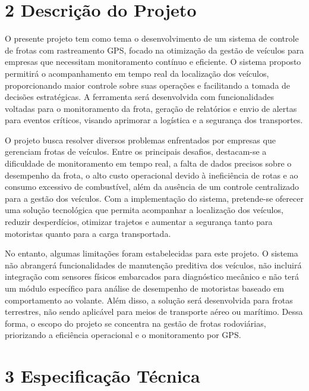\documentclass[12pt]{article}
\begin{document}
\newpage

\section*{2 Descrição do Projeto}

O presente projeto tem como tema o desenvolvimento de um sistema de controle de frotas com rastreamento GPS, focado na otimização da gestão de veículos para empresas que necessitam monitoramento contínuo e eficiente. O sistema proposto permitirá o acompanhamento em tempo real da localização dos veículos, proporcionando maior controle sobre suas operações e facilitando a tomada de decisões estratégicas. A ferramenta será desenvolvida com funcionalidades voltadas para o monitoramento da frota, geração de relatórios e envio de alertas para eventos críticos, visando aprimorar a logística e a segurança dos transportes.

O projeto busca resolver diversos problemas enfrentados por empresas que gerenciam frotas de veículos. Entre os principais desafios, destacam-se a dificuldade de monitoramento em tempo real, a falta de dados precisos sobre o desempenho da frota, o alto custo operacional devido à ineficiência de rotas e ao consumo excessivo de combustível, além da ausência de um controle centralizado para a gestão dos veículos. Com a implementação do sistema, pretende-se oferecer uma solução tecnológica que permita acompanhar a localização dos veículos, reduzir desperdícios, otimizar trajetos e aumentar a segurança tanto para motoristas quanto para a carga transportada.

No entanto, algumas limitações foram estabelecidas para este projeto. O sistema não abrangerá funcionalidades de manutenção preditiva dos veículos, não incluirá integração com sensores físicos embarcados para diagnóstico mecânico e não terá um módulo específico para análise de desempenho de motoristas baseado em comportamento ao volante. Além disso, a solução será desenvolvida para frotas terrestres, não sendo aplicável para meios de transporte aéreo ou marítimo. Dessa forma, o escopo do projeto se concentra na gestão de frotas rodoviárias, priorizando a eficiência operacional e o monitoramento por GPS.

\newpage


\section*{3 Especificação Técnica}
\end{document}
